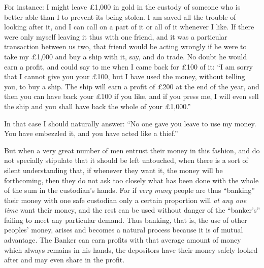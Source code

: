 \documentclass{book}
\begin{document}
For instance: I might leave £1,000 in gold in the custody of someone who is better able than I to prevent its being stolen. I am saved all the trouble of looking after it, and I can call on a part of it or all of it whenever I like. If there were only myself leaving it thus with one friend, and it was a particular transaction between us two, that friend would be acting wrongly if he were to take my £1,000 and buy a ship with it, say, and do trade. No doubt he would earn a profit, and could say to me when I came back for £100 of it: “I am sorry that I cannot give you your £100, but I have used the money, without telling you, to buy a ship. The ship will earn a profit of £200 at the end of the year, and then you can have back your £100 if you like, and if you press me, I will even sell the ship and you shall have back the whole of your £1,000.”

In that case I should naturally answer: “No one gave you leave to use my money. You have embezzled it, and you have acted like a thief.”

But when a very great number of men entrust their money in this fashion, and do not specially stipulate that it should be left untouched, when there is a sort of silent understanding that, if whenever they want it, the money will be forthcoming, then they do not ask too closely what has been done with the whole of the sum in the custodian’s hands. For if \emph{very many} people are thus “banking” their money with one safe custodian only a certain proportion will \emph{at any one time} want their money, and the rest can be used without danger of the “banker’s” failing to meet any particular demand. Thus banking, that is, the use of other peoples’ money, arises and becomes a natural process because it is of mutual advantage. The Banker can earn profits with that average amount of money which always remains in his hands, the depositors have their money safely looked after and may even share in the profit.
\end{document}
